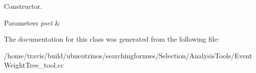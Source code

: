 Constructor. 


\begin{DoxyParams}{Parameters}
{\em pset} & \\
\hline
\end{DoxyParams}


The documentation for this class was generated from the following file\-:\begin{DoxyCompactItemize}
\item 
/home/travis/build/ubneutrinos/searchingfornues/\-Selection/\-Analysis\-Tools/Event\-Weight\-Tree\-\_\-tool.\-cc\end{DoxyCompactItemize}
